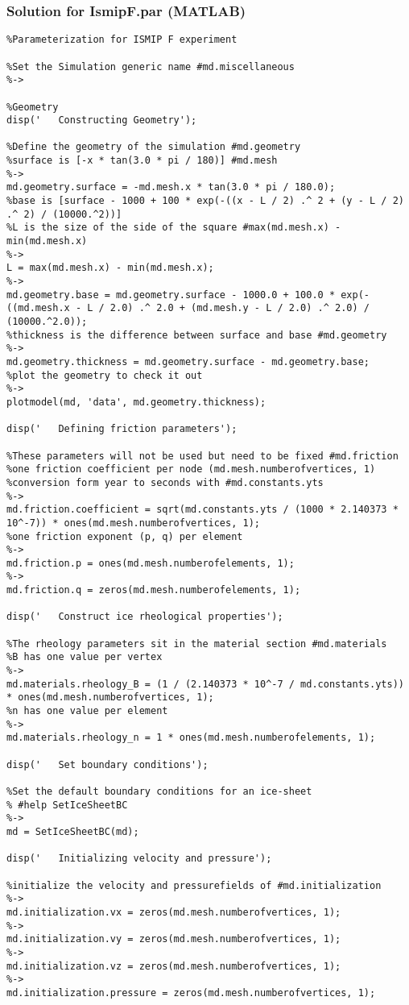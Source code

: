 \subsubsection{Solution for IsmipF.par (MATLAB)}%
\begin{lstlisting}
%Parameterization for ISMIP F experiment

%Set the Simulation generic name #md.miscellaneous
%->

%Geometry
disp('   Constructing Geometry');

%Define the geometry of the simulation #md.geometry
%surface is [-x * tan(3.0 * pi / 180)] #md.mesh
%->
md.geometry.surface = -md.mesh.x * tan(3.0 * pi / 180.0);
%base is [surface - 1000 + 100 * exp(-((x - L / 2) .^ 2 + (y - L / 2) .^ 2) / (10000.^2))]
%L is the size of the side of the square #max(md.mesh.x) - min(md.mesh.x)
%->
L = max(md.mesh.x) - min(md.mesh.x);
%->
md.geometry.base = md.geometry.surface - 1000.0 + 100.0 * exp(-((md.mesh.x - L / 2.0) .^ 2.0 + (md.mesh.y - L / 2.0) .^ 2.0) / (10000.^2.0));
%thickness is the difference between surface and base #md.geometry
%->
md.geometry.thickness = md.geometry.surface - md.geometry.base;
%plot the geometry to check it out
%->
plotmodel(md, 'data', md.geometry.thickness);

disp('   Defining friction parameters');

%These parameters will not be used but need to be fixed #md.friction
%one friction coefficient per node (md.mesh.numberofvertices, 1)
%conversion form year to seconds with #md.constants.yts
%->
md.friction.coefficient = sqrt(md.constants.yts / (1000 * 2.140373 * 10^-7)) * ones(md.mesh.numberofvertices, 1);
%one friction exponent (p, q) per element
%->
md.friction.p = ones(md.mesh.numberofelements, 1);
%->
md.friction.q = zeros(md.mesh.numberofelements, 1);

disp('   Construct ice rheological properties');

%The rheology parameters sit in the material section #md.materials
%B has one value per vertex
%->
md.materials.rheology_B = (1 / (2.140373 * 10^-7 / md.constants.yts)) * ones(md.mesh.numberofvertices, 1);
%n has one value per element
%->
md.materials.rheology_n = 1 * ones(md.mesh.numberofelements, 1);

disp('   Set boundary conditions');

%Set the default boundary conditions for an ice-sheet
% #help SetIceSheetBC
%->
md = SetIceSheetBC(md);

disp('   Initializing velocity and pressure');

%initialize the velocity and pressurefields of #md.initialization
%->
md.initialization.vx = zeros(md.mesh.numberofvertices, 1);
%->
md.initialization.vy = zeros(md.mesh.numberofvertices, 1);
%->
md.initialization.vz = zeros(md.mesh.numberofvertices, 1);
%->
md.initialization.pressure = zeros(md.mesh.numberofvertices, 1);
\end{lstlisting}
